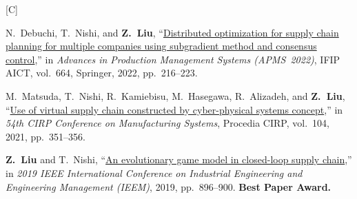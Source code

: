 \documentclass[11pt,a4paper]{article}
\newcommand{\doititle}[2]{\href{https://doi.org/#1}{#2}}
\newlength{\datecol}
\newcounter{pubno}
\newenvironment{publist}[1]{%
  \begin{list}{[#1\arabic{pubno}]}{%
    \usecounter{pubno}%
    \setlength{\leftmargin}{\datecol}%
    \setlength{\labelwidth}{\datecol}%
    \setlength{\labelsep}{0pt}%
    \setlength{\itemsep}{3pt}%
    \setlength{\parsep}{0pt}%
    \setlength{\topsep}{2pt}%
    \renewcommand{\makelabel}[1]{##1\hfil}}}%
  {\end{list}}
\begin{document}
\begin{publist}{C}
\item N.~Debuchi, T.~Nishi, and \textbf{Z.~Liu}, ``\doititle{10.1007/978-3-031-16411-8_27}{Distributed optimization for supply chain planning for multiple companies using subgradient method and consensus control},'' in \textit{Advances in Production Management Systems (APMS~2022)}, IFIP AICT, vol.~664, Springer, 2022, pp.~216--223.
\item M.~Matsuda, T.~Nishi, R.~Kamiebisu, M.~Hasegawa, R.~Alizadeh, and \textbf{Z.~Liu}, ``\doititle{10.1016/j.procir.2021.11.059}{Use of virtual supply chain constructed by cyber-physical systems concept},'' in \textit{54th {CIRP} Conference on Manufacturing Systems}, Procedia CIRP, vol.~104, 2021, pp.~351--356.
\item \textbf{Z.~Liu} and T.~Nishi, ``\doititle{10.1109/ieem44572.2019.8978741}{An evolutionary game model in closed-loop supply chain},'' in \textit{2019 IEEE International Conference on Industrial Engineering and Engineering Management (IEEM)}, 2019, pp.~896--900. \textbf{Best Paper Award.}
\end{publist}
\end{document}
